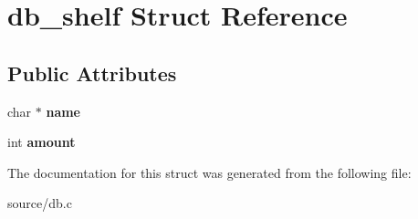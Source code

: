 \hypertarget{structdb__shelf}{}\section{db\+\_\+shelf Struct Reference}
\label{structdb__shelf}
\subsection*{Public Attributes}
\begin{DoxyCompactItemize}
\item 
char $\ast$ {\bfseries name}\hypertarget{structdb__shelf_a63eaad2c3ceae1956f53b387553b2817}{}\label{structdb__shelf_a63eaad2c3ceae1956f53b387553b2817}

\item 
int {\bfseries amount}\hypertarget{structdb__shelf_a2332ad296d9fc533aad8cddb3970180d}{}\label{structdb__shelf_a2332ad296d9fc533aad8cddb3970180d}

\end{DoxyCompactItemize}


The documentation for this struct was generated from the following file\+:\begin{DoxyCompactItemize}
\item 
source/db.\+c\end{DoxyCompactItemize}
